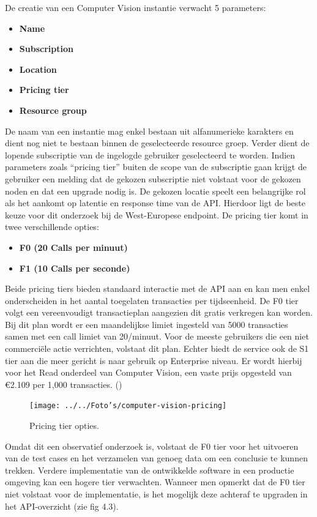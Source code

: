 De creatie van een Computer Vision instantie verwacht 5 parameters: 

\begin{itemize}
	\item \textbf{Name}
	\item \textbf{Subscription}
	\item \textbf{Location}
	\item \textbf{Pricing tier}
	\item \textbf{Resource group}
\end{itemize}
De naam van een instantie mag enkel bestaan uit alfanumerieke karakters en dient nog niet te bestaan binnen de geselecteerde resource groep. Verder dient de lopende subscriptie van de ingelogde gebruiker geselecteerd te worden. Indien parameters zoals “pricing tier” buiten de scope van de subscriptie gaan krijgt de gebruiker een melding dat de gekozen subscriptie niet volstaat voor de gekozen noden en dat een upgrade nodig is. De gekozen locatie speelt een belangrijke rol als het aankomt op latentie en response time van de API. Hierdoor ligt de beste keuze voor dit onderzoek bij de West-Europese endpoint. 
\newpage
De pricing tier komt in twee verschillende opties:  
\begin{itemize}
	\item \textbf{F0 (20 Calls per minuut)}
	\item \textbf{F1 (10 Calls per seconde)}
\end{itemize}

Beide pricing tiers bieden standaard interactie met de API aan en kan men enkel onderscheiden in het aantal toegelaten transacties per tijdseenheid. De F0 tier volgt een vereenvoudigt transactieplan aangezien dit gratis verkregen kan worden. Bij dit plan wordt er een maandelijkse limiet ingesteld van 5000 transacties samen met een call limiet van 20/minuut. Voor de meeste gebruikers die een niet commerciële actie verrichten, volstaat dit plan. Echter biedt de service ook de S1 tier aan die meer gericht is naar gebruik op Enterprise niveau. Er wordt hierbij voor het Read onderdeel van Computer Vision, een vaste prijs opgesteld van €2.109 per 1,000 transacties. (\cite{Microsoft2020g}) 

\begin{figure}[h]
	
	\texttt{[image: ../../Foto's/computer-vision-pricing]}
	\captionsetup{justification=centering,margin=2cm}
	\caption{Pricing tier opties.}
	\centering
\end{figure}
Omdat dit een observatief onderzoek is, volstaat de F0 tier voor het uitvoeren van de test cases en het verzamelen van genoeg data om een conclusie te kunnen trekken. Verdere implementatie van de ontwikkelde software in een productie omgeving kan een hogere tier verwachten. Wanneer men opmerkt dat de F0 tier niet volstaat voor de implementatie, is het mogelijk deze achteraf te upgraden in het API-overzicht (zie fig 4.3). 



